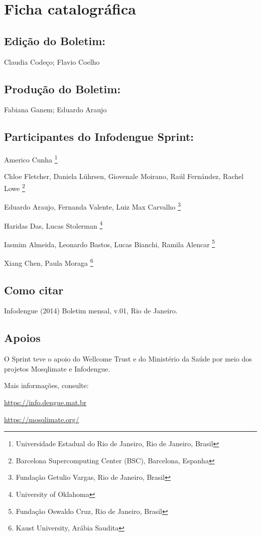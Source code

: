 \section{Ficha catalográfica}


\subsection{Edição do Boletim:}

Claudia Codeço; Flavio Coelho

\subsection{Produção do Boletim:}

Fabiana Ganem; Eduardo Araujo


\subsection{Participantes do Infodengue Sprint:}
 
Americo Cunha \footnote{Universidade Estadual do Rio de Janeiro, Rio de Janeiro, Brasil} 

Chloe Fletcher, Daniela Lührsen, Giovenale Moirano, Raúl Fernández, Rachel Lowe \footnote{Barcelona Supercomputing Center (BSC), Barcelona, Espanha}

Eduardo Araujo, Fernanda Valente, Luiz Max Carvalho \footnote{Fundação Getulio Vargas, Rio de Janeiro, Brasil}

Haridas Das, Lucas Stolerman \footnote{University of Oklahoma}

Iasmim Almeida, Leonardo Bastos, 
Lucas Bianchi, Ramila Alencar \footnote{Fundação Oswaldo Cruz, Rio de Janeiro, Brasil}

Xiang Chen, Paula Moraga \footnote{Kaust University, Arábia Saudita}

\subsection{Como citar}

Infodengue (2014) Boletim mensal, v.01, Rio de Janeiro. 

\subsection{Apoios}

O Sprint teve o apoio do Wellcome Trust e do Ministério da Saúde por meio dos projetos Mosqlimate e Infodengue.

Mais informações, consulte:

\url{https://info.dengue.mat.br}

\url{https://mosqlimate.org/}



